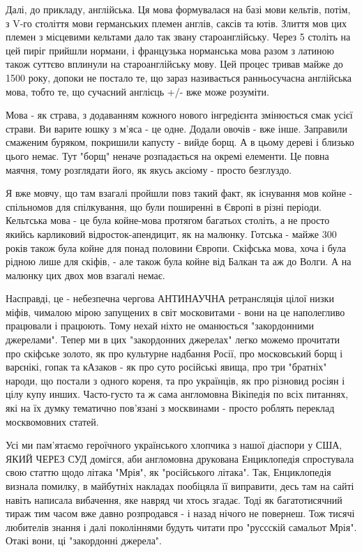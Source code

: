Далі, до прикладу, англійська. Ця мова формувалася на базі мови кельтів, потім,
з V-го століття мови германських племен англів, саксів та ютів. Злиття мов цих
племен з місцевими кельтами дало так звану староанглійську. Через 5 століть на
цей пиріг прийшли нормани, і французька норманська мова разом з латиною також
суттєво вплинули на староанглійську мову. Цей процес тривав майже до 1500 року,
допоки не постало те, що зараз називається ранньосучасна англійська мова, тобто
те, що сучасний англієць +/- вже може розуміти.

Мова - як страва, з додаванням кожного нового інгредієнта змінюється смак усієї
страви. Ви варите юшку з м'яса - це одне. Додали овочів - вже інше. Заправили
смаженим буряком, покришили капусту - вийде борщ. А в цьому дереві і близько
цього немає. Тут "борщ" неначе розпадається на окремі елементи. Це повна
маячня, тому розглядати його, як якусь аксіому - просто безглуздо.

Я вже мовчу, що там взагалі пройшли повз такий факт, як існування мов койне -
спільномов для спілкування, що були поширенні в Європі в різні періоди.
Кельтська мова - це була койне-мова протягом багатьох століть, а не просто
якийсь карликовий відросток-апендицит, як на малюнку. Готська - майже 300 років
також була койне для понад половини Європи. Скіфська мова, хоча і була рідною
лише для скіфів, - але також була койне від Балкан та аж до Волги. А на малюнку
цих двох мов взагалі немає.

Насправді, це - небезпечна чергова АНТИНАУЧНА ретрансляція цілої низки міфів,
чималою мірою запущених в світ московитами - вони на це наполегливо працювали і
працюють. Тому нехай ніхто не оманюється "закордонними джерелами". Тепер ми в
цих "закордонних джерелах" легко можемо прочитати про скіфське золото, як про
культурне надбання Росії, про московський борщ і варєнікі, гопак та кАзаков -
як про суто російські явища, про три "братніх" народи, що постали з одного
кореня, та про українців, як про різновид росіян і цілу купу инших. Часто-густо
та ж сама англомовна Вікіпедія по всіх питаннях, які на їх думку тематично
пов'язані з москвинами - просто роблять переклад москвомовних статей.

Усі ми пам'ятаємо героїчного українського хлопчика з нашої діаспори у США, ЯКИЙ
ЧЕРЕЗ СУД домігся, аби англомовна друкована Енциклопедія спростувала свою
статтю щодо літака "Мрія", як "російського літака". Так, Енциклопедія визнала
помилку, в майбутніх накладах пообіцяла її виправити, десь там на сайті навіть
написала вибачення, яке навряд чи хтось згадає. Тоді як багатотисячний тираж
тим часом вже давно розпродався - і назад нічого не повернеш. Тож тисячі
любителів знання і далі поколіннями будуть читати про "руссскій самальот Мрія".
Отакі вони, ці "закордонні джерела".

